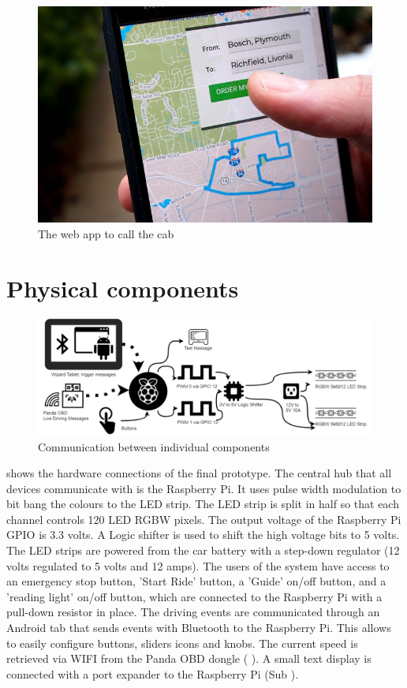 \begin{figure}
    \includegraphics[width=\textwidth]{fig/capp}
    \caption[Call a Cab App]{The web app to call the cab}
    \label{fig:capp}
\end{figure}

\section{Physical components}
\label{sec:physical}

\begin{figure}
    \includegraphics[width=1\textwidth]{fig/wizardfinal}
    \caption[Communication Overview]{Communication between individual components}
    \label{fig:communication}
\end{figure}

\emph{} shows the hardware connections of the final prototype. The central hub that all devices communicate with is the Raspberry Pi. It uses pulse width modulation to bit bang the colours to the LED strip. The LED strip is split in half so that each channel controls 120 LED RGBW pixels. The output voltage of the Raspberry Pi GPIO is 3.3 volts. A Logic shifter is used to shift the high voltage bits to 5 volts. The LED strips are powered from the car battery with a step-down regulator (12 volts regulated to 5 volts and 12 amps). The users of the system have access to an emergency stop button, 'Start Ride' button, a 'Guide' on/off button, and a 'reading light' on/off button, which are connected to the Raspberry Pi with a pull-down resistor in place. The driving events are communicated through an Android tab that sends events with Bluetooth to the Raspberry Pi. This allows to easily configure buttons, sliders icons and knobs. The current speed is retrieved via WIFI from the Panda OBD dongle ( \emph{}). A small text display is connected with a port expander to the Raspberry Pi (Sub \emph{}). 

